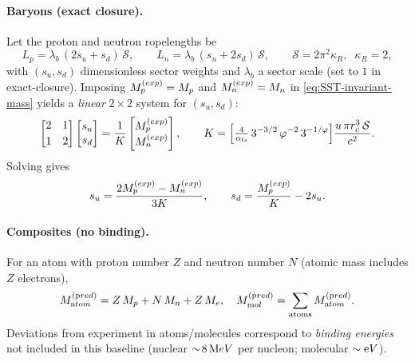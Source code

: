 \documentclass[11pt]{article}
\begin{document}
        \paragraph{Baryons (exact closure).}
            Let the proton and neutron ropelengths be
            \[
                L_p=\lambda_b\,(2s_u+s_d)\,\mathcal S,\qquad
                L_n=\lambda_b\,(s_u+2s_d)\,\mathcal S,\qquad
                \mathcal S=2\pi^2\kappa_R,\;\;\kappa_R=2,
            \]
            with $(s_u,s_d)$ dimensionless sector weights and $\lambda_b$ a sector scale (set to $1$ in exact-closure).
            Imposing $M_p^{\textrm(exp)}=M_p$ and $M_n^{\textrm(exp)}=M_n$ in \eqref{eq:SST-invariant-mass} yields a \emph{linear} $2\times2$ system for $(s_u,s_d)$:
            \[
                \begin{bmatrix}
                2 & 1\\[2pt]
                1 & 2
                \end{bmatrix}
                \begin{bmatrix}
                s_u\\ s_d
                \end{bmatrix}
                =
                \frac{1}{K}
                \begin{bmatrix}
                M_p^{\textrm(exp)}\\ M_n^{\textrm(exp)}
                \end{bmatrix},
                \qquad
                K=\Big[\tfrac{4}{\alpha_{\textrm fs}}\,3^{-3/2}\,\varphi^{-2}\,3^{-1/\varphi}\Big]\frac{u\,\pi r_c^3\,\mathcal S}{c^2}.
            \]
            Solving gives
            \[
                s_u=\frac{2M_p^{\textrm(exp)}-M_n^{\textrm(exp)}}{3K},
                \qquad
                s_d=\frac{M_p^{\textrm(exp)}}{K}-2s_u.
            \]

        \paragraph{Composites (no binding).}
            For an atom with proton number $Z$ and neutron number $N$ (atomic mass includes $Z$ electrons),
            \[
                M_{\textrm atom}^{(\textrm pred)} = Z\,M_p+N\,M_n+Z\,M_e,\quad
                M_{\textrm mol}^{(\textrm pred)}=\sum_{\text{atoms}}M_{\textrm atom}^{(\textrm pred)}.
            \]
            Deviations from experiment in atoms/molecules correspond to \emph{binding energies} not included in this baseline (nuclear $\sim\!8\,{\textrm MeV}$ per nucleon; molecular $\sim{\textrm eV}$).
\end{document}
